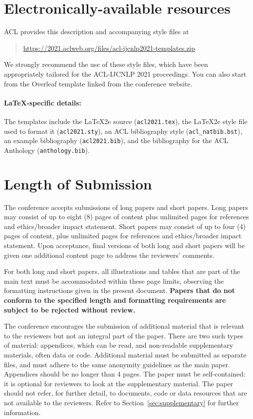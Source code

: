 \documentclass[11pt,a4paper]{article}
\begin{document}
\section{Electronically-available resources}

ACL provides this description and accompanying style files at
\begin{quote}
\url{https://2021.aclweb.org/files/acl-ijcnlp2021-templates.zip}
\end{quote}
We strongly recommend the use of these style files, which have been appropriately tailored for the ACL-IJCNLP 2021 proceedings. You can also start from the Overleaf template linked from the conference website.

\paragraph{\LaTeX-specific details:}
The templates include the \LaTeX2e{} source (\texttt{\small acl2021.tex}),
the \LaTeX2e{} style file used to format it (\texttt{\small acl2021.sty}),
an ACL bibliography style (\texttt{\small acl\_natbib.bst}),
an example bibliography (\texttt{\small acl2021.bib}),
and the bibliography for the ACL Anthology (\texttt{\small anthology.bib}).


\section{Length of Submission}
\label{sec:length}

The conference accepts submissions of long papers and short papers. Long papers may consist of up to eight (8) pages of content plus unlimited pages for references and ethics/broader impact statement. Short papers may consist of up to four (4) pages of content, plus unlimited pages for references and ethics/broader impact statement. Upon acceptance, final versions of both long and short papers will be given one additional content page to address the reviewers' comments.

For both long and short papers, all illustrations and tables that are part of the main text must be accommodated within these page limits, observing the formatting instructions given in the present document. 
\textbf{Papers that do not conform to the specified length and formatting requirements are subject to be rejected without review.}

The conference encourages the submission of additional material that is relevant to the reviewers but not an integral part of the paper.
There are two such types of material: appendices, which can be read, and non-readable supplementary materials, often data or code. 
Additional material must be submitted as separate files, and must adhere to the same anonymity guidelines as the main paper. Appendices should be no longer than 4 pages.
The paper must be self-contained: it is optional for reviewers to look at the supplementary material.
The paper should not refer, for further detail, to documents, code or data resources that are not available to the reviewers.
Refer to Section~\ref{sec:supplementary} for further information. 
\end{document}
